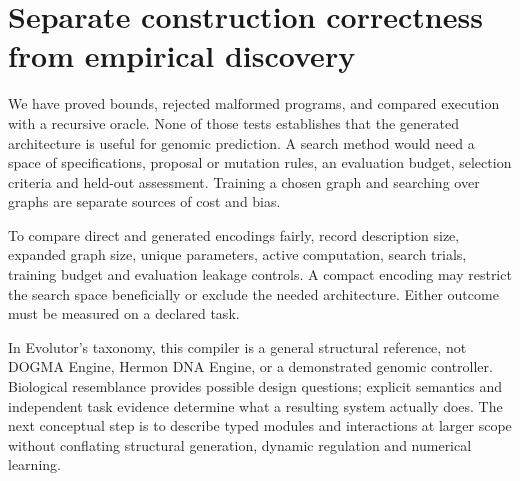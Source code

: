 \section{Separate construction correctness from empirical discovery}
We have proved bounds, rejected malformed programs, and compared execution
with a recursive oracle. None of those tests establishes that the generated
architecture is useful for genomic prediction. A search method would need
a space of specifications, proposal or mutation rules, an evaluation
budget, selection criteria and held-out assessment. Training a chosen
graph and searching over graphs are separate sources of cost and bias.

To compare direct and generated encodings fairly, record description size,
expanded graph size, unique parameters, active computation, search trials,
training budget and evaluation leakage controls. A compact encoding may
restrict the search space beneficially or exclude the needed architecture.
Either outcome must be measured on a declared task.

In Evolutor's taxonomy, this compiler is a general structural reference,
not DOGMA Engine, Hermon DNA Engine, or a demonstrated genomic controller.
Biological resemblance provides possible design questions; explicit semantics
and independent task evidence determine what a resulting system actually does.
The next conceptual step is to describe typed modules and interactions at
larger scope without conflating structural generation, dynamic regulation
and numerical learning.

\clearpage
